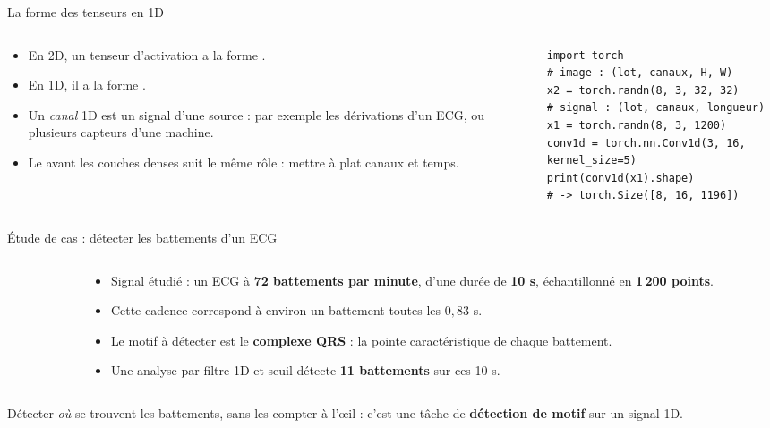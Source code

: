 \begin{frame}[fragile]{La forme des tenseurs en 1D}
\begin{columns}[t]
\begin{column}{0.50\textwidth}
\begin{itemize}
  \item En 2D, un tenseur d'activation a la forme
  .
  \item En 1D, il a la forme .
  \item Un \emph{canal} 1D est un signal d'une source : par exemple les
  dérivations d'un ECG, ou plusieurs capteurs d'une machine.
  \item Le  avant les couches denses suit le même rôle : mettre à
  plat canaux et temps.
\end{itemize}
\end{column}
\begin{column}{0.48\textwidth}
\begin{codebox}
\begin{lstlisting}
import torch
# image : (lot, canaux, H, W)
x2 = torch.randn(8, 3, 32, 32)
# signal : (lot, canaux, longueur)
x1 = torch.randn(8, 3, 1200)
conv1d = torch.nn.Conv1d(3, 16, kernel_size=5)
print(conv1d(x1).shape)
# -> torch.Size([8, 16, 1196])
\end{lstlisting}
\end{codebox}
\end{column}
\end{columns}
\end{frame}

\begin{frame}{Étude de cas : détecter les battements d'un ECG}
\begin{columns}[t]
\begin{column}{0.52\textwidth}
\centering
\end{column}
\begin{column}{0.45\textwidth}
\begin{itemize}
  \item Signal étudié : un ECG à \textbf{72 battements par minute},
  d'une durée de \textbf{10 s}, échantillonné en \textbf{1\,200 points}.
  \item Cette cadence correspond à environ un battement toutes les
  $0{,}83$ s.
  \item Le motif à détecter est le \textbf{complexe QRS} : la pointe
  caractéristique de chaque battement.
  \item Une analyse par filtre 1D et seuil détecte \textbf{11 battements}
  sur ces 10 s.
\end{itemize}
\end{column}
\end{columns}
\vspace{0.5mm}
\begin{kbox}
Détecter \emph{où} se trouvent les battements, sans les compter à l'\oe{}il :
c'est une tâche de \textbf{détection de motif} sur un signal 1D.
\end{kbox}
\end{frame}

